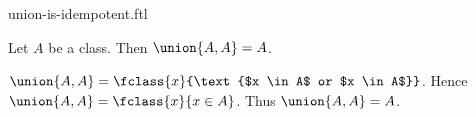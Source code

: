 \documentclass{article}
\begin{document}
\begin{smodule}[creators={Marcel Schütz}]{union-is-idempotent.ftl}

  \begin{fproposition*}[label=6505712620404736]
    Let $A$ be a class.
    Then $\union{A,A} = A$.
  \end{fproposition*}
  \begin{fproof}
    $\union{A,A} = \fclass{x}{\text{$x \in A$ or $x \in A$}}$.
    Hence $\union{A,A} = \fclass{x}{x \in A}$.
    Thus $\union{A,A} = A$.
  \end{fproof}
\end{smodule}
\end{document}
